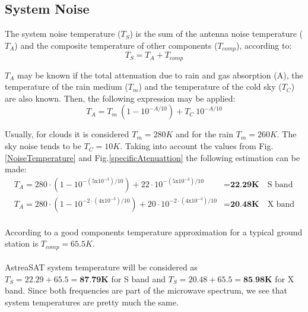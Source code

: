 \subsection{System Noise}
The system noise temperature ($T_S$) is the sum of the antenna noise temperature ($T_A$) and
the composite temperature of other components ($T_{comp}$), according to:    \cite{Jorge2012}
\begin{equation}
T_S=T_A+T_{comp}
\end{equation}

$T_A$ may be known if the total attenuation due to rain and gas absorption (A), the
temperature of the rain medium ($T_m$) and the temperature of the cold sky ($T_C$) are also
known. Then, the following expression may be applied:
\begin{equation}
	T_A=T_m\ (1-10^{-A/10})+T_C\ 10^{-A/10}
\end{equation}

Usually, for clouds it is considered $T_m=280K$ and for the rain $T_m=260K$. The sky noise tends to be $T_C=10K$. Taking into account the values from Fig.\ref{NoiseTemperature} and Fig.\ref{specificAtenuattion} the following estimation can be made:
\begin{align*}
	T_A=280\cdot (1-10^{-(5\mathrm{x}10^{-3})/10})+22\cdot 10^{-(5\mathrm{x}10^{-3})/10}&=\textbf{22.29K} \quad \text{S band} \\
	T_A=280\cdot (1-10^{-2\cdot(4\mathrm{x}10^{-3})/10})+20\cdot 10^{-2\cdot(4\mathrm{x}10^{-3})/10}&=\textbf{20.48K} \quad \text{X band} 
\end{align*}

\paragraph{} According to \cite{Jorge2012} a good components temperature approximation for a typical ground station is $T_{comp}=65.5K$.

\paragraph{} AstreaSAT system temperature will be considered as $T_S=22.29+65.5=\textbf{87.79K}$ for S band and $T_S=20.48+65.5=\textbf{85.98K}$ for X band. Since both frequencies are part of the microwave spectrum, we see that system temperatures are pretty much the same.

